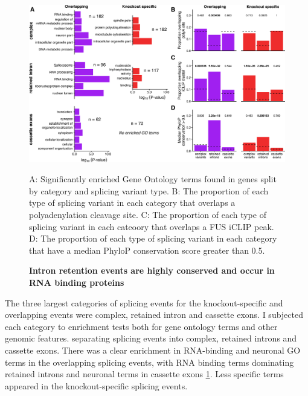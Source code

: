 \begin{figure}[h!]
	\centering
	\includegraphics[width=\textwidth]{Figures/06_fus_meta/splicing_go_functions.png}
	\caption{\textbf{Intron retention events are highly conserved and occur in RNA binding proteins} }	
	A: Significantly enriched Gene Ontology terms found in genes split by category and splicing variant type.
	B: The proportion of each type of splicing variant in each category that overlaps a polyadenylation cleavage site.
	C: The proportion of each type of splicing variant in each cateoory that overlaps a FUS iCLIP peak.
	D: The proportion of each type of splicing variant in each category that have a median PhyloP conservation score greater than 0.5.
	\label{fig:fus_splicing_functions}
\end{figure}

The three largest categories of splicing events for the knockout-specific and overlapping events were complex, retained intron and cassette exons. 
I subjected each category to enrichment tests both for gene ontology terms and other genomic features. separating splicing events into complex, retained introns and cassette exons.
There was a clear enrichment in RNA-binding and neuronal GO terms in the overlapping splicing events, with RNA binding terms dominating retained introns and neuronal terms in cassette exons \ref{fig:fus_splicing_functions}. 
Less specific terms appeared in the knockout-specific splicing events.

